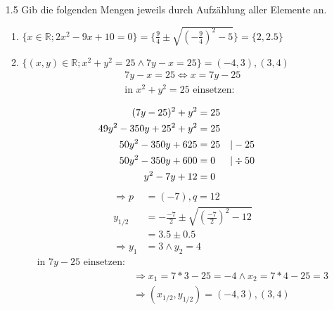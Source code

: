 \documentclass[12pt,letterpaper]{article}
\newcommand{\alignleft}[1]{\tag*{\llap{\makebox[\linewidth][l]{$#1$}}}}
\newcommand{\LLeftrightarrow}{ \alignleft{\Leftrightarrow}}
\newcommand{\eqinfo}[1]{&\makebox[2cm][l]{$\vert #1$}}
\newcommand{\Eqn}[2]{#1 &= #2}
\newcommand{\eqnf}[2]{\Eqn{#1}{#2}\\}
\newcommand{\eqn}[2]{\LLeftrightarrow\Eqn{#1}{#2}\\}
\newcommand{\eqni}[3]{\LLeftrightarrow\Eqn{#1}{#2}\eqinfo{#3}\\}
\begin{document}
\begin{enumerate}
\item [1.5] Gib die folgenden Mengen jeweils durch Aufzählung aller Elemente an.
\begin{enumerate}
\item $\lbrace x\in\mathbb{R}; 2x^2-9x+10=0\rbrace = \lbrace\frac{9}{4}\pm\sqrt{\left(-\frac{9}{4}\right)^2-5}\rbrace=\lbrace2,2.5\rbrace$
\item $\lbrace(x,y)\in\mathbb{R};x^2+y^2=25\land 7y-x=25\rbrace = {(-4,3),(3,4)}$
\\
\begin{align*}
7y-x=25\Leftrightarrow x=7y-25\\
\text{in } x^2+y^2=25 \text{ einsetzen:}\\
\end{align*}
\begin{align*}
\eqnf{(7y-25)^2+y^2}{25}
\eqn{49y^2-350y+25^2+y^2}{25}
\eqni{50y^2-350y+625}{25}{-25}
\eqni{50y^2-350y+600}{0}{\div 50}
\eqn{y^2-7y+12}{0}
\end{align*}
\begin{align*}
\Rightarrow p&=(-7), q=12\\
y_{1/2} &= -\frac{-7}{2}\pm\sqrt{\left(\frac{-7}{2}\right)^2-12}\\
&=3.5\pm 0.5\\
\Rightarrow y_{1}&=3 \land y_{2}=4
\end{align*}
\begin{align*}
\text{in } 7y-25 \text{ einsetzen:}\\
&\Rightarrow x_1=7*3-25=-4\land x_2=7*4-25=3\\
&\Rightarrow (x_{1/2},y_{1/2})=(-4,3),(3,4)
\end{align*}


\end{enumerate}
\end{enumerate}
\end{document}

